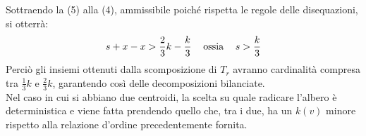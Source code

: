 \begin{itemize}
Sottraendo la (5) alla (4), ammissibile poich\'e rispetta le regole delle disequazioni, si otterr\`a:\\
\begin{equation}
	s + x - x > \frac{2}{3} k - \frac{k}{3} \hspace{0.3cm} \text{    ossia    }\hspace{0.3cm} s > \frac{k}{3}
\end{equation}
Perci\`o gli insiemi ottenuti dalla scomposizione di $T_r$ avranno cardinalit\`a compresa tra $\frac{1}{3} k$ e $\frac{2}{3} k$, garantendo cos\`i delle decomposizioni bilanciate.\\ 
Nel caso in cui si abbiano due centroidi, la scelta su quale radicare l’albero  \`e deterministica e  viene fatta prendendo quello che, tra i due, ha un $k(v)$ minore rispetto alla relazione d’ordine precedentemente fornita.


\end{itemize}

